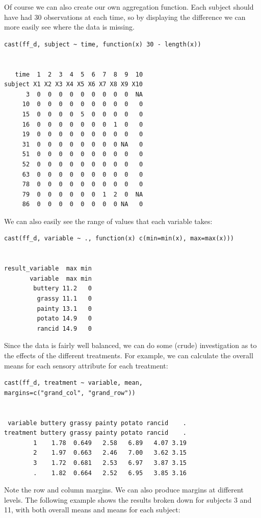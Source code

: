 \documentclass[]{article}
\begin{document}
Of course we can also create our own aggregation function.  Each subject should have had 30 observations at each time, so by displaying the difference we can more easily see where the data is missing.

\begin{verbatim}
cast(ff_d, subject ~ time, function(x) 30 - length(x))

                                      
   time  1  2  3  4  5  6  7  8  9  10
subject X1 X2 X3 X4 X5 X6 X7 X8 X9 X10
      3  0  0  0  0  0  0  0  0  0  NA
     10  0  0  0  0  0  0  0  0  0   0
     15  0  0  0  0  5  0  0  0  0   0
     16  0  0  0  0  0  0  0  1  0   0
     19  0  0  0  0  0  0  0  0  0   0
     31  0  0  0  0  0  0  0  0 NA   0
     51  0  0  0  0  0  0  0  0  0   0
     52  0  0  0  0  0  0  0  0  0   0
     63  0  0  0  0  0  0  0  0  0   0
     78  0  0  0  0  0  0  0  0  0   0
     79  0  0  0  0  0  0  1  2  0  NA
     86  0  0  0  0  0  0  0  0 NA   0
\end{verbatim}

We can also easily see the range of values that each variable takes:

\begin{verbatim}
cast(ff_d, variable ~ ., function(x) c(min=min(x), max=max(x)))

                        
result_variable  max min
       variable  max min
        buttery 11.2   0
         grassy 11.1   0
         painty 13.1   0
         potato 14.9   0
         rancid 14.9   0
\end{verbatim}

Since the data is fairly well balanced, we can do some (crude) investigation as to the effects of the different treatments.  For example, we can calculate the overall means for each sensory attribute for each treatment:

\begin{verbatim}
cast(ff_d, treatment ~ variable, mean, 
margins=c("grand_col", "grand_row"))

                                                  
 variable buttery grassy painty potato rancid    .
treatment buttery grassy painty potato rancid    .
        1    1.78  0.649   2.58   6.89   4.07 3.19
        2    1.97  0.663   2.46   7.00   3.62 3.15
        3    1.72  0.681   2.53   6.97   3.87 3.15
        .    1.82  0.664   2.52   6.95   3.85 3.16
\end{verbatim}

Note the row and column margins.  We can also produce margins at different levels.  The following example shows the results broken down for subjects 3 and 11, with both overall means and means for each subject:
\end{document}
